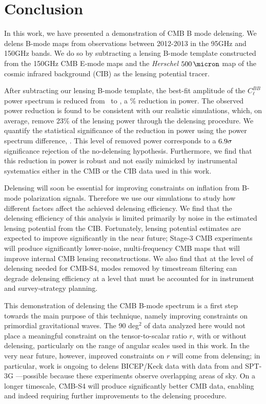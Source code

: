 \section{Conclusion}
\label{sec:conclusion}

In this work, we have presented a demonstration of CMB B mode delensing.
We delens B-mode maps from \sptpol observations between 2012-2013 in the 95GHz and 150GHz bands.
We do so by subtracting a lensing B-mode template constructed from the \sptpol 150GHz CMB E-mode maps and the \textit{Herschel} $500\,\micron$ map of the cosmic infrared background (CIB) as the lensing potential tracer.

After subtracting our lensing B-mode template, the best-fit amplitude of the $C_{\ell}^{BB}$ power spectrum is reduced from \AlensNom\ to \AlensDel,
a \effData\% reduction in power.
The observed power reduction is found to be consistent with our realistic simulations, which, on average, remove 23\% of the lensing power through the delensing procedure.
We quantify the statistical significance of the reduction in power using the power spectrum difference, \Dclbb.
This level of removed power corresponds to a $6.9\sigma$ significance rejection of the no-delensing hypothesis.
Furthermore, we find that this reduction in power is robust and not easily mimicked by instrumental systematics either in the CMB or the CIB data used in this work.

Delensing will soon be essential for improving constraints on inflation from B-mode polarization signals.
Therefore we use our simulations to study how different factors affect the achieved delensing efficiency.
We find that the delensing efficiency of this analysis is limited primarily by noise in the estimated lensing potential from the CIB.
Fortunately, lensing potential estimates are expected to improve significantly in the near future;
Stage-3 CMB experiments will produce significantly lower-noise, multi-frequency CMB maps that will improve internal CMB lensing reconstructions.
We also find that at the level of delensing needed for CMB-S4, modes removed by timestream filtering can degrade delensing efficiency at a level that must be accounted for in instrument and survey-strategy planning.

This demonstration of delensing the CMB B-mode spectrum is a first step towards the main purpose of this technique, namely improving constraints on primordial gravitational waves.
The 90 deg$^2$ of \sptpol data analyzed here would not place a meaningful constraint on the tensor-to-scalar ratio $r$, with or without delensing, particularly on the range of angular scales used in this work.
In the very near future, however, improved constraints on $r$ will come from delensing; in particular, work is ongoing to delens BICEP/Keck data with data from \sptpol and SPT-3G \citep{benson14}---possible because these experiments observe overlapping areas of sky.
On a longer timescale, CMB-S4 will produce significantly better CMB data, enabling and indeed requiring further improvements to the delensing procedure.



